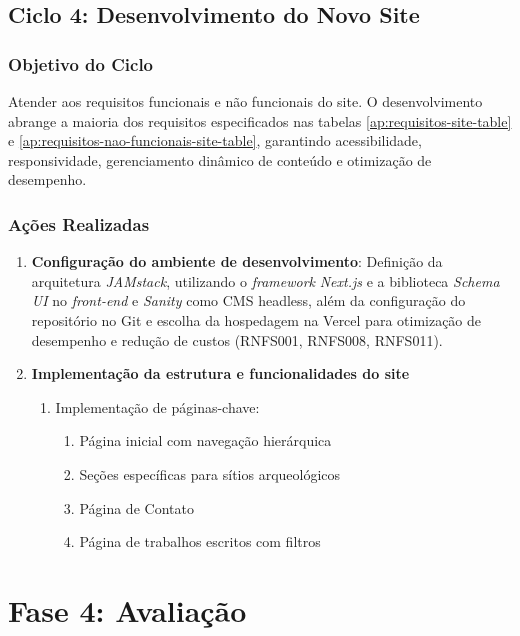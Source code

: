 \subsection*{Ciclo 4: Desenvolvimento do Novo Site} \label{subsec:ciclo4}

\subsubsection*{Objetivo do Ciclo}
Atender aos requisitos funcionais e não funcionais do site. O desenvolvimento abrange a maioria dos requisitos especificados nas tabelas \ref{ap:requisitos-site-table} e \ref{ap:requisitos-nao-funcionais-site-table}, garantindo acessibilidade, responsividade, gerenciamento dinâmico de conteúdo e otimização de desempenho.

\subsubsection*{Ações Realizadas}
\begin{enumerate}
\item \textbf{Configuração do ambiente de desenvolvimento}: Definição da arquitetura \textit{JAMstack}, utilizando o \textit{framework} \textit{Next.js} e a biblioteca \textit{Schema UI} no \textit{front-end} e \textit{Sanity} como CMS headless, além da configuração do repositório no Git e escolha da hospedagem na Vercel para otimização de desempenho e redução de custos (RNFS001, RNFS008, RNFS011).

    
    \item \textbf{Implementação da estrutura e funcionalidades do site}
    \begin{enumerate}
        \item Implementação de páginas-chave:
        \begin{enumerate}
            \item Página inicial com navegação hierárquica
            \item Seções específicas para sítios arqueológicos
            \item Página de Contato
            \item Página de trabalhos escritos com filtros
        \end{enumerate}
    \end{enumerate}
    
\end{enumerate}

\section{Fase 4: Avaliação} \label{sec:avaliacao-dsr}

